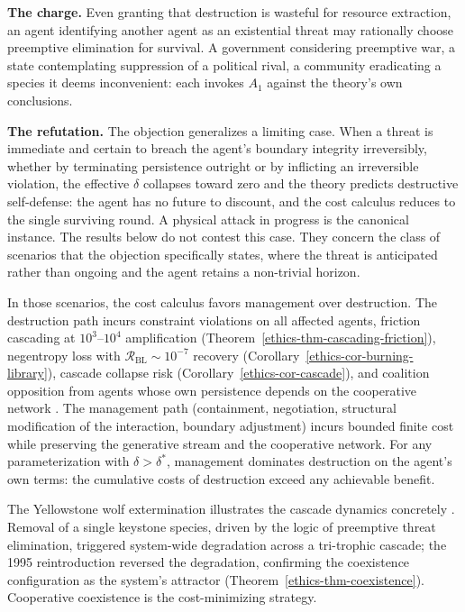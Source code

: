 \documentclass[11pt]{article}
\theoremstyle{plain}
\theoremstyle{definition}
\theoremstyle{remark}
\begin{document}
\textbf{The charge.} Even granting that destruction is wasteful for
resource extraction, an agent identifying another agent as an
existential threat may rationally choose preemptive elimination for
survival. A government considering preemptive war, a state contemplating
suppression of a political rival, a community eradicating a species it
deems inconvenient: each invokes \(A_1\) against the theory's own
conclusions.

\textbf{The refutation.} The objection generalizes a limiting case. When
a threat is immediate and certain to breach the agent's boundary
integrity irreversibly, whether by terminating persistence outright or
by inflicting an irreversible violation, the effective \(\delta\)
collapses toward zero and the theory predicts destructive self-defense:
the agent has no future to discount, and the cost calculus reduces to
the single surviving round. A physical attack in progress is the
canonical instance. The results below do not contest this case. They
concern the class of scenarios that the objection specifically states,
where the threat is anticipated rather than ongoing and the agent
retains a non-trivial horizon.

In those scenarios, the cost calculus favors management over
destruction. The destruction path incurs constraint violations on all
affected agents, friction cascading at \(10^3\)--\(10^4\) amplification
(Theorem~\ref{ethics-thm-cascading-friction}), negentropy loss with
\(\mathcal{R}_{\text{BL}} \sim 10^{-7}\) recovery
(Corollary~\ref{ethics-cor-burning-library}), cascade collapse risk
(Corollary~\ref{ethics-cor-cascade}), and coalition opposition from
agents whose own persistence depends on the cooperative network
\citep{TC-III}. The management path (containment, negotiation,
structural modification of the interaction, boundary adjustment) incurs
bounded finite cost while preserving the generative stream and the
cooperative network. For any parameterization with
\(\delta > \delta^*\), management dominates destruction on the agent's
own terms: the cumulative costs of destruction exceed any achievable
benefit.

The Yellowstone wolf extermination illustrates the cascade dynamics
concretely \citep{SmithDW2003, RippleBeschta2012}. Removal of a single
keystone species, driven by the logic of preemptive threat elimination,
triggered system-wide degradation across a tri-trophic cascade; the 1995
reintroduction reversed the degradation, confirming the coexistence
configuration as the system's attractor
(Theorem~\ref{ethics-thm-coexistence}). Cooperative coexistence is the
cost-minimizing strategy.
\end{document}

